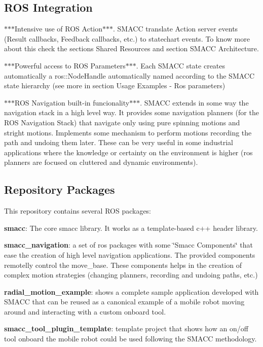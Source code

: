 \subsection*{R\-O\-S Integration}


\begin{DoxyItemize}
\item $\ast$$\ast$$\ast$\-Intensive use of R\-O\-S Action$\ast$$\ast$$\ast$. S\-M\-A\-C\-C translate Action server events (Result callbacks, Feedback callbacks, etc.) to statechart events. To know more about this check the sections Shared Resources and section S\-M\-A\-C\-C Architecture.
\item $\ast$$\ast$$\ast$\-Powerful access to R\-O\-S Parameters$\ast$$\ast$$\ast$. Each S\-M\-A\-C\-C state creates automatically a ros\-::\-Node\-Handle automatically named according to the S\-M\-A\-C\-C state hierarchy (see more in section Usage Examples -\/ Ros parameters)
\item $\ast$$\ast$$\ast$\-R\-O\-S Navigation built-\/in funcionality$\ast$$\ast$$\ast$. S\-M\-A\-C\-C extends in some way the navigation stack in a high level way. It provides some navigation planners (for the R\-O\-S Navigation Stack) that navigate only using pure spinning motions and stright motions. Implements some mechanism to perform motions recording the path and undoing them later. These can be very useful in some industrial applications where the knowledge or certainty on the environment is higher (ros planners are focused on cluttered and dynamic environments).
\end{DoxyItemize}

\subsection*{Repository Packages}

This repository contains several R\-O\-S packages\-:


\begin{DoxyItemize}
\item {\bfseries smacc}\-: The core smacc library. It works as a template-\/based c++ header library.
\item {\bfseries smacc\-\_\-navigation}\-: a set of ros packages with some \char`\"{}\-Smacc Components\char`\"{} that ease the creation of high level navigation applications. The provided components remotelly control the move\-\_\-base. These components helps in the creation of complex motion strategies (changing planners, recording and undoing paths, etc.)
\item {\bfseries radial\-\_\-motion\-\_\-example}\-: shows a complete sample application developed with S\-M\-A\-C\-C that can be reused as a canonical example of a mobile robot moving around and interacting with a custom onboard tool.
\item {\bfseries smacc\-\_\-tool\-\_\-plugin\-\_\-template}\-: template project that shows how an on/off tool onboard the mobile robot could be used following the S\-M\-A\-C\-C methodology.
\end{DoxyItemize}

